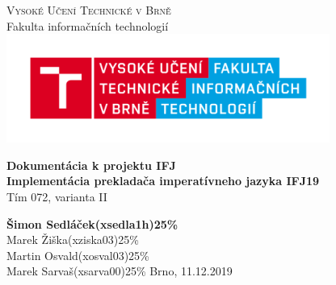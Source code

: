 \documentclass{article}
\begin{document}

	\begin{titlepage}
		\begin{center}
			\textsc{\Huge Vysoké Učení Technické v Brně} \\[0.7cm]
			{\Huge Fakulta informačních technologií}
			\center\includegraphics[width=0.5\linewidth]{./logo.png}

			\vspace{5cm}

			\textbf{{\Huge Dokumentácia k projektu IFJ}}\\[0.4cm]
			\textbf{{\LARGE Implementácia prekladača imperatívneho jazyka IFJ19}}\\[0.4cm]
			\LARGE{Tím 072, varianta II}\\
			
		\end{center}
		\vfill

		\begin{flushleft}
			\begin{Large}
				\textbf{Šimon Sedláček}\hspace{10px}\textbf{(xsedla1h)}\hspace{10px}\textbf{25\% }\\[0.25cm]
				Marek Žiška\hspace{44px}(xziska03)\hspace{22px}25\%  \\[0.25cm]
				Martin Osvald\hspace{32px}(xosval03)\hspace{20px}25\% \\[0.25cm]
				Marek Sarvaš\hspace{37px}(xsarva00)\hspace{19px}25\% 
			\hfill
			Brno, 11.12.2019
			\end{Large}
		\end{flushleft}

	\end{titlepage}


	\tableofcontents
	\newpage
\end{document}
